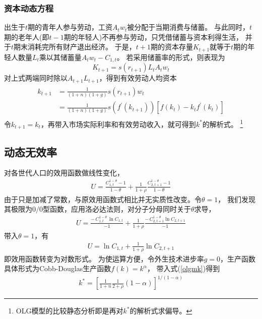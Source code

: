 \documentclass[cn,normal,11pt,black]{elegantnote}
\begin{document}
\subsubsection*{资本动态方程}

出生于$t$期的青年人参与劳动，工资$A_t w_t$被分配于当期消费与储蓄。
与此同时，$t$期的老年人(即$t-1$期的年轻人)不再参与劳动，只凭借储蓄与资本利得生活，
并于$t$期末消耗完所有财产退出经济。
于是，$t+1$期的资本存量$K_{t+1}$就等于$t$期的年轻人数量$L_t$乘以其储蓄量$A_t w_t - C_{1,t}$。
若采用储蓄率的形式，则表现为
    \begin{equation}
        K_{t+1} = s(r_{t+1}) L_t A_t w_t
    \end{equation}
对上式两端同时除以$A_{t+1} L_{t+1}$，得到有效劳动人均资本
\begin{align}
    \begin{aligned} \label{olgmk}
        k_{t+1} & = \frac{1}{(1+n)(1+g)} s(r_{t+1}) w_t \\
                & = \frac{1}{(1+n)(1+g)} s(f^\prime(k_{t+1})) \left[f(k_t) - k_t f^\prime(k_{t})\right]
    \end{aligned}
\end{align}
令$k_{t+1} = k_t$，再带入市场实际利率和有效劳动收入，就可得到$k^*$的解析式。
\footnote{OLG模型的比较静态分析即是再对$k^*$的解析式求偏导。}

\subsection{动态无效率}

对各世代人口的效用函数做线性变化，
\begin{align}
    U = \frac{C_{1,t}^{1-\theta} -1}{1-\theta} + \frac{1}{1+\rho} \frac{C_{2, t+1}^{1-\theta} -1}{1-\theta}
\end{align}
由于只是加减了常数，与原效用函数式相比并无实质性改变。令$\theta =1$，
我们发现其极限为$0/0$型函数，应用洛必达法则，对分子分母同时关于$\theta$求导，
\begin{align}
U = \frac{- \, C_{1,t}^{1-\theta} \, \ln C_{1,t}}{-1} + \frac{1}{1+\rho} \frac{- \, C_{2, t+1}^{1-\theta} \ln C_{2,t+1}}{-1}
\end{align}
带入$\theta =1$，有
\begin{align}
U =  \ln C_{1,t} + \frac{1}{1+\rho} \ln C_{2,t+1}
\end{align}
即效用函数转变为对数形式。
为使运算方便，令外生技术进步率$g=0$，生产函数具体形式为Cobb-Douglas生产函数$f(k)=k^\alpha$，
带入式(\ref{olgmk})得到
\begin{align}
k^{*}=\left[\frac{1}{1+n} \frac{1}{2+\rho}(1-\alpha)\right]^{1 /(1-\alpha)}
\end{align}
\end{document}
